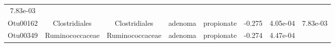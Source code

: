 \documentclass[11pt,]{article}
\begin{document}
\begin{longtable}[]{@{}cccccccc@{}}
\begin{minipage}[t]{0.08\columnwidth}
7.83e-03\strut
\end{minipage}\tabularnewline
\begin{minipage}[t]{0.08\columnwidth}\centering\strut
Otu00162\strut
\end{minipage} & \begin{minipage}[t]{0.15\columnwidth}\centering\strut
Clostridiales\strut
\end{minipage} & \begin{minipage}[t]{0.15\columnwidth}\centering\strut
Clostridiales\strut
\end{minipage} & \begin{minipage}[t]{0.08\columnwidth}\centering\strut
adenoma\strut
\end{minipage} & \begin{minipage}[t]{0.09\columnwidth}\centering\strut
propionate\strut
\end{minipage} & \begin{minipage}[t]{0.07\columnwidth}\centering\strut
-0.275\strut
\end{minipage} & \begin{minipage}[t]{0.08\columnwidth}\centering\strut
4.05e-04\strut
\end{minipage} & \begin{minipage}[t]{0.08\columnwidth}\centering\strut
7.83e-03\strut
\end{minipage}\tabularnewline
\begin{minipage}[t]{0.08\columnwidth}\centering\strut
Otu00349\strut
\end{minipage} & \begin{minipage}[t]{0.15\columnwidth}\centering\strut
Ruminococcaceae\strut
\end{minipage} & \begin{minipage}[t]{0.15\columnwidth}\centering\strut
Ruminococcaceae\strut
\end{minipage} & \begin{minipage}[t]{0.08\columnwidth}\centering\strut
adenoma\strut
\end{minipage} & \begin{minipage}[t]{0.09\columnwidth}\centering\strut
propionate\strut
\end{minipage} & \begin{minipage}[t]{0.07\columnwidth}\centering\strut
-0.274\strut
\end{minipage} & \begin{minipage}[t]{0.08\columnwidth}\centering\strut
4.47e-04\strut
\end{minipage} & \begin{minipage}[t]{0.08\columnwidth}\centering\strut

\end{minipage}
\end{longtable}
\end{document}

